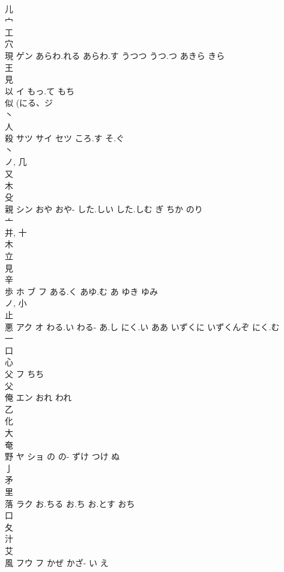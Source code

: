 \documentclass[8pt]{extreport}
\begin{document}
\begin{CJK}{UTF8}{min}
\\	儿 
\\	宀 
\\	工 
\\	穴 
\\	現	ゲン	あらわ.れる あらわ.す うつつ うつ.つ あきら きら	
\\	王 
\\	見 
\\	以	イ	もっ.て もち	
\\	似 (にる、ジ 
\\	丶 
\\	人 
\\	殺	サツ サイ セツ	ころ.す そ.ぐ	
\\	丶 
\\	ノ, 几 
\\	又 
\\	木 
\\	殳 
\\	親	シン	おや おや- した.しい した.しむ ぎ ちか のり	
\\	亠 
\\	并, 十 
\\	木 
\\	立 
\\	見 
\\	辛 
\\	歩	ホ ブ フ	ある.く あゆ.む あ ゆき ゆみ	
\\	ノ, 小 
\\	止 
\\	悪	アク オ	わる.い わる- あ.し にく.い ああ いずくに いずくんぞ にく.む	
\\	一 
\\	口 
\\	心 
\\	父	フ	ちち	
\\	父 
\\	俺	エン	おれ われ	
\\	乙 
\\	化 
\\	大 
\\	奄 
\\	野	ヤ ショ	の の- ずけ つけ ぬ	
\\	亅 
\\	矛 
\\	里 
\\	落	ラク	お.ちる お.ち お.とす おち	
\\	口 
\\	夂 
\\	汁 
\\	艾 
\\	風	フウ フ	かぜ かざ- い え	

\end{CJK}
\end{document}
